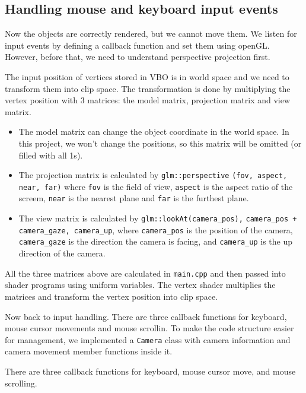 \documentclass[acmtog]{acmart}
\begin{document}
\subsection{Handling mouse and keyboard input events}

Now the objects are correctly rendered, but we cannot move them. We listen for input events by defining a callback function and set them using openGL. However, before that, we need to understand perspective projection first.

The input position of vertices stored in VBO is in world space and we need to transform them into clip space. The transformation is done by multiplying the vertex position with 3 matrices: the model matrix, projection matrix and view matrix.

\begin{itemize}
	\item The model matrix can change the object coordinate in the world space. In this project, we won't change the positions, so this matrix will be omitted (or filled with all 1s).
	\item The projection matrix is calculated by \verb|glm::perspective| \verb|(fov, aspect, near, far)| where \verb|fov| is the field of view, \verb|aspect| is the aspect ratio of the screem, \verb|near| is the nearest plane and \verb|far| is the furthest plane.
	\item The view matrix is calculated by \verb|glm::lookAt(camera_pos),| \verb|camera_pos + camera_gaze, camera_up|, where \verb|camera_pos| is the position of the camera, \verb|camera_gaze| is the direction the camera is facing, and \verb|camera_up| is the up direction of the camera.
\end{itemize}

All the three matrices above are calculated in \verb|main.cpp| and then passed into shader programs using uniform variables. The vertex shader multiplies the matrices and transform the vertex position into clip space.

Now back to input handling. There are three callback functions for keyboard, mouse cursor movements and mouse scrollin. To make the code structure easier for management, we implemented a \verb|Camera| class with camera information and camera movement member functions inside it.

There are three callback functions for keyboard, mouse cursor move, and mouse scrolling. 
\end{document}
